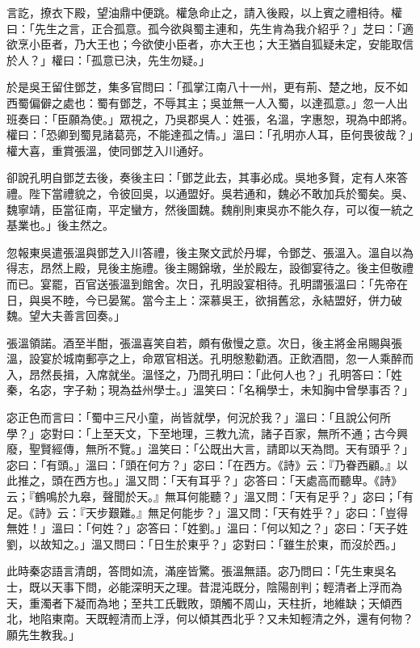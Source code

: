 言訖，撩衣下殿，望油鼎中便跳。權急命止之，請入後殿，以上賓之禮相待。權曰：「先生之言，正合孤意。孤今欲與蜀主連和，先生肯為我介紹乎？」芝曰：「適欲烹小臣者，乃大王也；今欲使小臣者，亦大王也；大王猶自狐疑未定，安能取信於人？」權曰：「孤意已決，先生勿疑。」

於是吳王留住鄧芝，集多官問曰：「孤掌江南八十一州，更有荊、楚之地，反不如西蜀偏僻之處也：蜀有鄧芝，不辱其主；吳並無一人入蜀，以達孤意。」忽一人出班奏曰：「臣願為使。」眾視之，乃吳郡吳人：姓張，名溫，字惠恕，現為中郎將。權曰：「恐卿到蜀見諸葛亮，不能達孤之情。」溫曰：「孔明亦人耳，臣何畏彼哉？」權大喜，重賞張溫，使同鄧芝入川通好。

卻說孔明自鄧芝去後，奏後主曰：「鄧芝此去，其事必成。吳地多賢，定有人來答禮。陛下當禮貌之，令彼回吳，以通盟好。吳若通和，魏必不敢加兵於蜀矣。吳、魏寧靖，臣當征南，平定蠻方，然後圖魏。魏削則東吳亦不能久存，可以復一統之基業也。」後主然之。

忽報東吳遣張溫與鄧芝入川答禮，後主聚文武於丹墀，令鄧芝、張溫入。溫自以為得志，昂然上殿，見後主施禮。後主賜錦墩，坐於殿左，設御宴待之。後主但敬禮而已。宴罷，百官送張溫到館舍。次日，孔明設宴相待。孔明謂張溫曰：「先帝在日，與吳不睦，今已晏駕。當今主上：深慕吳王，欲捐舊忿，永結盟好，併力破魏。望大夫善言回奏。」

張溫領諾。酒至半酣，張溫喜笑自若，頗有傲慢之意。次日，後主將金帛賜與張溫，設宴於城南郵亭之上，命眾官相送。孔明慇懃勸酒。正飲酒間，忽一人乘醉而入，昂然長揖，入席就坐。溫怪之，乃問孔明曰：「此何人也？」孔明答曰：「姓秦，名宓，字子勑；現為益州學士。」溫笑曰：「名稱學士，未知胸中曾學事否？」

宓正色而言曰：「蜀中三尺小童，尚皆就學，何況於我？」溫曰：「且說公何所學？」宓對曰：「上至天文，下至地理，三教九流，諸子百家，無所不通；古今興廢，聖賢經傳，無所不覽。」溫笑曰：「公既出大言，請即以天為問。天有頭乎？」宓曰：「有頭。」溫曰：「頭在何方？」宓曰：「在西方。《詩》云：『乃眷西顧。』以此推之，頭在西方也。」溫又問：「天有耳乎？」宓答曰：「天處高而聽卑。《詩》云；『鶴鳴於九皋，聲聞於天。』無耳何能聽？」溫又問：「天有足乎？」宓曰；「有足。《詩》云：『天步艱難。』無足何能步？」溫又問：「天有姓乎？」宓曰：「豈得無姓！」溫曰：「何姓？」宓答曰：「姓劉。」溫曰：「何以知之？」宓曰：「天子姓劉，以故知之。」溫又問曰：「日生於東乎？」宓對曰：「雖生於東，而沒於西。」

此時秦宓語言清朗，答問如流，滿座皆驚。張溫無語。宓乃問曰：「先生東吳名士，既以天事下問，必能深明天之理。昔混沌既分，陰陽剖判；輕清者上浮而為天，重濁者下凝而為地；至共工氏戰敗，頭觸不周山，天柱折，地維缺；天傾西北，地陷東南。天既輕清而上浮，何以傾其西北乎？又未知輕清之外，還有何物？願先生教我。」

